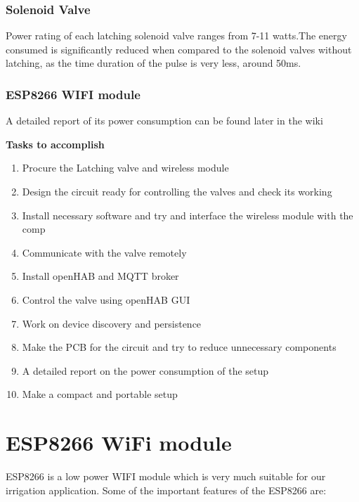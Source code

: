 \documentclass[16pt]{article}
\begin{document}
 
\subsubsection{Solenoid Valve}

Power rating of each latching solenoid valve
ranges from 7-11 watts.The energy consumed is significantly reduced when
compared to the solenoid valves without latching, as the time duration
of the pulse is very less, around 50ms.

\subsubsection{ESP8266 WIFI module}

A detailed report of its power consumption can be found later in the
wiki




\hfill

{\Large{\textbf{Tasks to accomplish}}}

\begin{enumerate}

\item
  Procure the Latching valve and wireless module
\item
  Design the circuit ready for controlling the valves and check its
  working
\item
  Install necessary software and try and interface the wireless module
  with the comp
\item
  Communicate with the valve remotely
\item
  Install openHAB and MQTT broker
\item
  Control the valve using openHAB GUI
\item
  Work on device discovery and persistence
\item
  Make the PCB for the circuit and try to reduce unnecessary components
\item
  A detailed report on the power consumption of the setup
\item
  Make a compact and portable setup
\end{enumerate}


\vspace{5cm}
\section{ESP8266 WiFi module}

\vspace{0.5cm}

ESP8266 is a low power WIFI module which is very much suitable for our
irrigation application. Some of the important features of the ESP8266
are:
\end{document}
